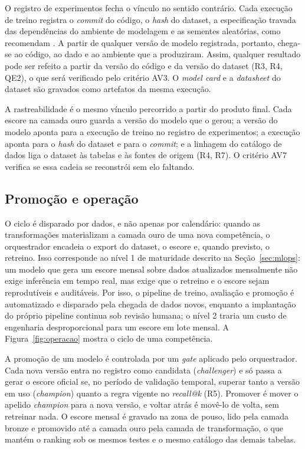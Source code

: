 O registro de experimentos fecha o vínculo no sentido contrário. Cada execução de treino registra o \textit{commit} do código, o \textit{hash} do dataset, a especificação travada das dependências do ambiente de modelagem e as sementes aleatórias, como recomendam . A partir de qualquer versão de modelo registrada, portanto, chega-se ao código, ao dado e ao ambiente que a produziram. Assim, qualquer resultado pode ser refeito a partir da versão do código e da versão do dataset (R3, R4, QE2), o que será verificado pelo critério AV3. O \textit{model card} \cite{mitchell2019} e a \textit{datasheet} do dataset \cite{gebru2021} são gravados como artefatos da mesma execução.

A rastreabilidade é o mesmo vínculo percorrido a partir do produto final. Cada escore na camada ouro guarda a versão do modelo que o gerou; a versão do modelo aponta para a execução de treino no registro de experimentos; a execução aponta para o \textit{hash} do dataset e para o \textit{commit}; e a linhagem do catálogo de dados liga o dataset às tabelas e às fontes de origem (R4, R7). O critério AV7 verifica se essa cadeia se reconstrói sem elo faltando.

\subsection{Promoção e operação}
\label{sec:promocao}

O ciclo é disparado por dados, e não apenas por calendário: quando as transformações materializam a camada ouro de uma nova competência, o orquestrador encadeia o export do dataset, o escore e, quando previsto, o retreino. Isso corresponde ao nível 1 de maturidade descrito na Seção~\ref{sec:mlops}: um modelo que gera um escore mensal sobre dados atualizados mensalmente não exige inferência em tempo real, mas exige que o retreino e o escore sejam reprodutíveis e auditáveis. Por isso, o pipeline de treino, avaliação e promoção é automatizado e disparado pela chegada de dados novos, enquanto a implantação do próprio pipeline continua sob revisão humana; o nível 2 traria um custo de engenharia desproporcional para um escore em lote mensal. A Figura~\ref{fig:operacao} mostra o ciclo de uma competência.

A promoção de um modelo é controlada por um \textit{gate} aplicado pelo orquestrador. Cada nova versão entra no registro como candidata (\textit{challenger}) e só passa a gerar o escore oficial se, no período de validação temporal, superar tanto a versão em uso (\textit{champion}) quanto a regra vigente no \textit{recall@k} (R5). Promover é mover o apelido \textit{champion} para a nova versão, e voltar atrás é movê-lo de volta, sem retreinar nada. O escore mensal é gravado na zona de pouso, lido pela camada bronze e promovido até a camada ouro pela camada de transformação, o que mantém o ranking sob os mesmos testes e o mesmo catálogo das demais tabelas.


